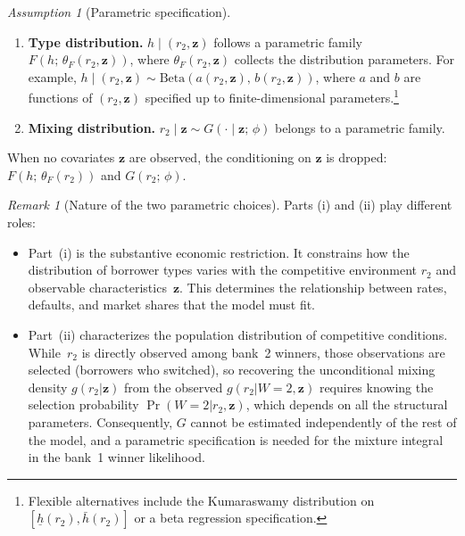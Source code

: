 \documentclass[12pt]{article}
\theoremstyle{plain}
\theoremstyle{plain}
\theoremstyle{definition}  %
\theoremstyle{remark}  %
\newtheorem{remark}[thm]{Remark}  %
\newtheorem{ass}[thm]{Assumption}
\begin{document}
\begin{ass}[Parametric specification]\label{ass:parametric}
\begin{enumerate}
    \item[(i)] \textbf{Type distribution.} $h \mid (r_2, \mathbf{z})$ follows a parametric family $F(h;\, \theta_F(r_2, \mathbf{z}))$, where $\theta_F(r_2, \mathbf{z})$ collects the distribution parameters. For example, $h \mid (r_2, \mathbf{z}) \sim \text{Beta}(a(r_2, \mathbf{z}),\, b(r_2, \mathbf{z}))$, where $a$ and $b$ are functions of $(r_2, \mathbf{z})$ specified up to finite-dimensional parameters.\footnote{Flexible alternatives include the Kumaraswamy distribution on $[\underline{h}(r_2), \bar{h}(r_2)]$ or a beta regression specification.}
    
    \item[(ii)] \textbf{Mixing distribution.} $r_2 \mid \mathbf{z} \sim G(\cdot \mid \mathbf{z};\, \phi)$ belongs to a parametric family.
\end{enumerate}
When no covariates $\mathbf{z}$ are observed, the conditioning on $\mathbf{z}$ is dropped: $F(h;\, \theta_F(r_2))$ and $G(r_2;\, \phi)$.
\end{ass}

\begin{remark}[Nature of the two parametric choices]\label{rem:assumptions}
Parts (i) and (ii) play different roles:
\begin{itemize}
    \item Part~(i) is the substantive economic restriction. It constrains how the distribution of borrower types varies with the competitive environment $r_2$ and observable characteristics~$\mathbf{z}$. This determines the relationship between rates, defaults, and market shares that the model must fit.
    \item Part~(ii) characterizes the population distribution of competitive conditions. While~$r_2$ is directly observed among bank~2 winners, those observations are selected (borrowers who switched), so recovering the unconditional mixing density $g(r_2|\mathbf{z})$ from the observed $g(r_2|W\!=\!2, \mathbf{z})$ requires knowing the selection probability $\Pr(W\!=\!2 | r_2, \mathbf{z})$, which depends on all the structural parameters. Consequently, $G$ cannot be estimated independently of the rest of the model, and a parametric specification is needed for the mixture integral in the bank~1 winner likelihood.
\end{itemize}
\end{remark}
\end{document}
